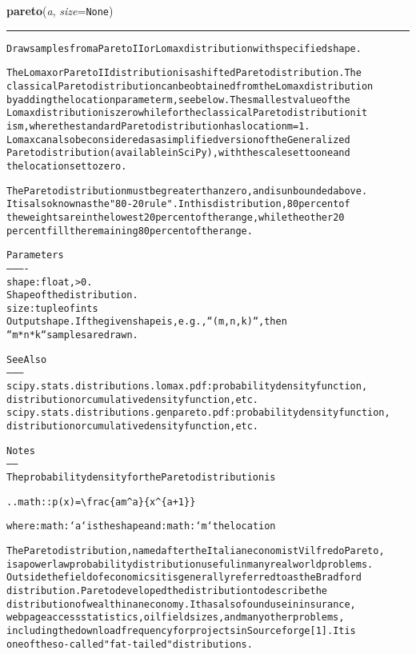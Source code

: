 \hspace{.8\funcindent}\begin{boxedminipage}{\funcwidth}

    \raggedright \textbf{pareto}(\textit{a}, \textit{size}={\tt None})

    \vspace{-1.5ex}

    \rule{\textwidth}{0.5\fboxrule}
\setlength{\parskip}{2ex}
\begin{alltt}
Draw samples from a Pareto II or Lomax distribution with specified shape.

The Lomax or Pareto II distribution is a shifted Pareto distribution. The
classical Pareto distribution can be obtained from the Lomax distribution
by adding the location parameter m, see below. The smallest value of the
Lomax distribution is zero while for the classical Pareto distribution it
is m, where the standard Pareto distribution has location m=1.
Lomax can also be considered as a simplified version of the Generalized
Pareto distribution (available in SciPy), with the scale set to one and
the location set to zero.

The Pareto distribution must be greater than zero, and is unbounded above.
It is also known as the "80-20 rule".  In this distribution, 80 percent of
the weights are in the lowest 20 percent of the range, while the other 20
percent fill the remaining 80 percent of the range.

Parameters
----------
shape : float, {\textgreater} 0.
    Shape of the distribution.
size : tuple of ints
    Output shape.  If the given shape is, e.g., ``(m, n, k)``, then
    ``m * n * k`` samples are drawn.

See Also
--------
scipy.stats.distributions.lomax.pdf : probability density function,
    distribution or cumulative density function, etc.
scipy.stats.distributions.genpareto.pdf : probability density function,
    distribution or cumulative density function, etc.

Notes
-----
The probability density for the Pareto distribution is

.. math:: p(x) = {\textbackslash}frac\{am{\textasciicircum}a\}\{x{\textasciicircum}\{a+1\}\}

where :math:`a` is the shape and :math:`m` the location

The Pareto distribution, named after the Italian economist Vilfredo Pareto,
is a power law probability distribution useful in many real world problems.
Outside the field of economics it is generally referred to as the Bradford
distribution. Pareto developed the distribution to describe the
distribution of wealth in an economy.  It has also found use in insurance,
web page access statistics, oil field sizes, and many other problems,
including the download frequency for projects in Sourceforge [1].  It is
one of the so-called "fat-tailed" distributions.



\end{alltt}
\end{boxedminipage}
